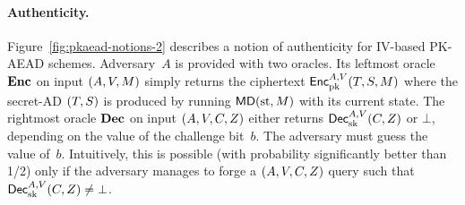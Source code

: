 
\paragraph{Authenticity. }  Figure~\ref{fig:pkaead-notions-2} describes a notion of authenticity for IV-based PK-AEAD schemes.  Adversary~$A$ is provided with two oracles.  Its leftmost oracle~$\textbf{Enc}$ on input $(A,V,M)$ simply returns the ciphertext ${\mathsf{Enc}}_{\mathrm{pk}}^{A,V}(T,S,M)$ where the secret-AD $(T,S)$ is produced by running $\mathsf{MD}(\mathrm{st},M)$ with its current state.  The rightmost oracle $\textbf{Dec}$ on input $(A,V,C,Z)$ either returns ${\mathsf{Dec}}_{\mathrm{sk}}^{A,V}(C,Z)$ or $\bot$, depending on the value of the challenge bit~$b$.  The adversary must guess the value of~$b$.  Intuitively, this is possible (with probability significantly better than 1/2) only if the adversary manages to forge a $(A,V,C,Z)$ query such that ${\mathsf{Dec}}_{\mathrm{sk}}^{A,V}(C,Z) \neq \bot$.


